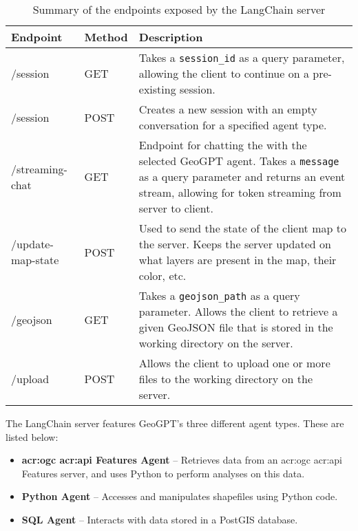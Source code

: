 \begin{table}[H]
    \centering
    \caption[API endpoints exposed by GeoGPT's LangChain server]{Summary of the endpoints exposed by the LangChain server}
    \label{tbl:server-endpoints}
    \begin{tabular}{p{}p{}p{}}
        \toprule
        \textbf{Endpoint} & \textbf{Method} & \textbf{Description}                                                                                                                                                                     \\
        \midrule
        /session          & GET             & Takes a \texttt{session\_id} as a query parameter, allowing the client to continue on a pre-existing session.                                                                            \\
        /session          & POST            & Creates a new session with an empty conversation for a specified agent type.                                                                                                             \\
        /streaming-chat   & GET             & Endpoint for chatting the with the selected GeoGPT agent. Takes a \texttt{message} as a query parameter and returns an event stream, allowing for token streaming from server to client. \\
        /update-map-state & POST            & Used to send the state of the client map to the server. Keeps the server updated on what layers are present in the map, their color, etc.                                                \\
        /geojson          & GET             & Takes a \texttt{geojson\_path} as a query parameter. Allows the client to retrieve a given GeoJSON file that is stored in the working directory on the server.                           \\
        /upload           & POST            & Allows the client to upload one or more files to the working directory on the server.                                                                                                    \\
        \bottomrule
    \end{tabular}
\end{table}

The LangChain server features GeoGPT's three different agent types. These are listed below:

\begin{itemize}
    \item \textbf{\acrshort{acr:ogc} \acrshort{acr:api} Features Agent} -- Retrieves data from an \acrshort{acr:ogc} \acrshort{acr:api} Features server, and uses Python to perform analyses on this data.
    \item \textbf{Python Agent} -- Accesses and manipulates shapefiles using Python code.
    \item \textbf{SQL Agent} -- Interacts with data stored in a PostGIS database.
\end{itemize}

